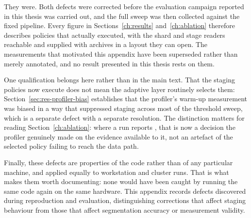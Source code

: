 They were. Both defects were corrected before the evaluation campaign reported
in this thesis was carried out, and the full sweep was then collected against
the fixed pipeline. Every figure in Sections~\ref{ch:results}
and~\ref{ch:ablation} therefore describes policies that actually executed, with
the shard and stage readers reachable and supplied with archives in a layout
they can open. The measurements that motivated this appendix have been
superseded rather than merely annotated, and no result presented in this thesis
rests on them.

One qualification belongs here rather than in the main text. That the staging
policies now execute does not mean the adaptive layer routinely selects them:
Section~\ref{sec:res-profiler-bias} establishes that the profiler's warm-up
measurement was biased in a way that suppressed staging across most of the
threshold sweep, which is a separate defect with a separate resolution. The
distinction matters for reading Section~\ref{ch:ablation}: where a run reports
, that is now a decision the profiler genuinely made on the evidence
available to it, not an artefact of the selected policy failing to reach the
data path.

Finally, these defects are properties of the code rather than of any particular
machine, and applied equally to workstation and cluster runs. That is what makes
them worth documenting: none would have been caught by running the same code
again on the same hardware.
This appendix records defects discovered during reproduction and evaluation,
distinguishing corrections that affect staging behaviour from those that affect
segmentation accuracy or measurement validity.
